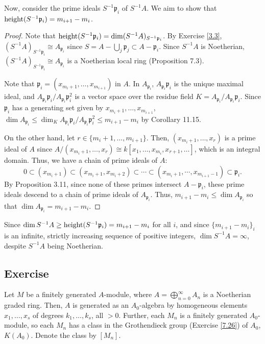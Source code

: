 Now, consider the prime ideals $S^{-1}\mathfrak{p}_i$ of $S^{-1}A$. We aim to show that $\operatorname{height}(S^{-1}\mathfrak{p}_i) = m_{i+1} - m_i$.

\begin{proof}
Note that $\operatorname{height}(S^{-1}\mathfrak{p}_i) = \dim (S^{-1}A)_{S^{-1}\mathfrak{p}_i}$. By Exercise \ref{3.3}, 
$(S^{-1}A)_{S^{-1}\mathfrak{p}_i} \cong A_{\mathfrak{p}_i}$ since $S = A - \bigcup_j \mathfrak{p}_j \subset A - \mathfrak{p}_i$.
Since $S^{-1}A$ is Noetherian, $(S^{-1}A)_{S^{-1}\mathfrak{p}_i} \cong A_{\mathfrak{p}_i}$ is a Noetherian local ring (Proposition 7.3).

Note that $\mathfrak{p}_i = (x_{m_i+1},\ldots,x_{m_{i+1}})$ in $A$. In $A_{\mathfrak{p}_i}$, $A_{\mathfrak{p}_i}\mathfrak{p}_i$ is the unique maximal ideal, and
$A_{\mathfrak{p}_i}\mathfrak{p}_i/A_{\mathfrak{p}_i}\mathfrak{p}_i^2$ is a vector space over the residue field $K = A_{\mathfrak{p}_i}/A_{\mathfrak{p}_i}\mathfrak{p}_i$. 
Since $\mathfrak{p}_i$ has a generating set given by $x_{m_i + 1}, \ldots, x_{m_{i+1}}$, 
$\dim A_{\mathfrak{p}_i} \le \dim_K A_{\mathfrak{p}_i}\mathfrak{p}_i/A_{\mathfrak{p}_i}\mathfrak{p}_i^2 \le m_{i+1} - m_i$ by Corollary 11.15.

On the other hand, let $r \in \{m_i+1,\ldots,m_{i+1}\}$. Then, $(x_{m_i + 1}, \ldots, x_r)$ is a prime ideal of $A$ since
$A/(x_{m_i + 1}, \ldots, x_r) \cong k[x_1,\ldots,x_{m_i},x_{r+1},\ldots]$, which is an integral domain.
Thus, we have a chain of prime ideals of $A$:
$$0 \subset (x_{m_i + 1}) \subset (x_{m_i + 1}, x_{m_i + 2}) \subset \cdots \subset (x_{m_i + 1}, \cdots, x_{m_{i+1}-1}) \subset \mathfrak{p}_i.$$
By Proposition 3.11, since none of these primes intersect $A - \mathfrak{p}_i$, these prime ideals descend to a chain of prime ideals of $A_{\mathfrak{p}_i}$.
Thus, $m_{i+1} - m_i \le \dim A_{\mathfrak{p}_i}$ so that $\dim A_{\mathfrak{p}_i} = m_{i+1} - m_i$.
\end{proof}

Since $\dim S^{-1}A \ge \operatorname{height}(S^{-1}\mathfrak{p}_i) = m_{i+1} - m_i$ for all $i$, and since $\{m_{i+1} - m_i\}_i$ is an infinite, strictly 
increasing sequence of positive integers, $\dim S^{-1}A = \infty$, despite $S^{-1}A$ being Noetherian.

\subsection{Exercise}\label{11.5}

Let $M$ be a finitely generated $A$-module, where $A = \bigoplus_{n=0}^{\infty} A_n$ is a Noetherian graded ring. Then, $A$ is generated
as an $A_0$-algebra by homogeneous elements $x_1,\ldots,x_s$ of degrees $k_1,\ldots,k_s$, all $> 0$. Further, each $M_n$ is a finitely
generated $A_0$-module, so each $M_n$ has a class in the Grothendieck group (Exercise \ref{7.26}) of $A_0$, $K(A_0)$. Denote the class by $[M_n]$.

